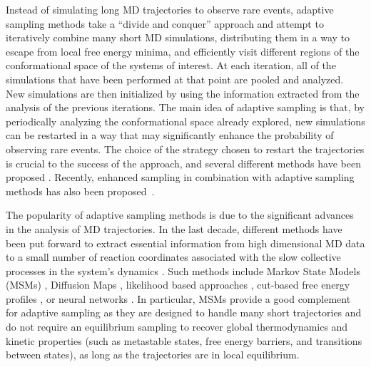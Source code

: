 Instead of simulating long MD trajectories to observe rare events, adaptive sampling
methods take a ``divide and conquer'' approach and attempt to iteratively
combine many short MD simulations, distributing them in a way to 
escape from local free energy minima, and efficiently visit different regions of
the conformational space of the systems of interest.
At each iteration, all of the simulations that have been performed at that
point are pooled and analyzed. New simulations are then initialized by
using the information extracted from the analysis of the previous iterations.
The main idea of adaptive sampling is that, by periodically analyzing the
conformational space already explored, new simulations can be restarted 
in a way that may significantly enhance the probability of observing rare
events. The choice of the strategy chosen to restart the trajectories is crucial
to the success of the approach, and several different methods have been
proposed \cite{weber2011characterization, Fabritiis-2014,
AdaptivePELE-Lecina2017,preto2014fast, doerr2016htmd,roblitz2013fuzzy,
weexplore, WESTPA-Zwier2015}.
Recently, enhanced sampling in combination with adaptive sampling methods has
also been proposed~\cite{pathreweight5}.


The popularity of adaptive sampling methods is due to the significant advances in the
analysis of MD trajectories. In the last decade, different methods have been
put forward to extract essential information from high dimensional MD data to a
small number of reaction coordinates associated with the slow
collective processes in the system's dynamics \cite{rohrdanz2013discovering,
noe2017collective}. Such methods include Markov State Models (MSMs) \cite{prinz2011markov,
MSM-Pande-2018,bookmsm,masterequationsMSM,SCHUTTE1999146}, Diffusion Maps
\cite{Coifman7426, rohrdanz2011determination,Zheng2011, Boninsegna2015}, likelihood based approaches
\cite{peters2006obtaining}, cut-based free energy profiles
\cite{krivov2008diffusive}, or neural networks \cite{Mardt2018,wehmeyer2018time,
ribeiro2018reweighted}.  In particular, MSMs provide a good complement for
adaptive sampling as they are designed to handle many short trajectories and
do not require an equilibrium sampling to recover global thermodynamics and
kinetic properties (such as metastable states, free energy barriers, and
transitions between states), as long as the trajectories are in local
equilibrium.  


